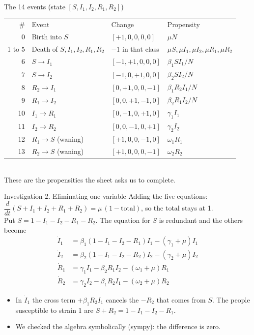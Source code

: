 \begin{frame}{The 14 events (state $[S,I_1,I_2,R_1,R_2]$)}
\small
\renewcommand{\arraystretch}{1.18}
\centering
\begin{tabular}{r l l l}
\rowcolor{aimsred}\color{white}\# & \color{white}Event & \color{white}Change & \color{white}Propensity\\
0 & Birth into $S$ & $[+1,0,0,0,0]$ & $\mu N$\\
\rowcolor{rowpink} 1 to 5 & Death of $S,I_1,I_2,R_1,R_2$ & $-1$ in that class & $\mu S,\mu I_1,\mu I_2,\mu R_1,\mu R_2$\\
6 & $S\to I_1$ & $[-1,+1,0,0,0]$ & $\beta_1SI_1/N$\\
\rowcolor{rowpink} 7 & $S\to I_2$ & $[-1,0,+1,0,0]$ & $\beta_2SI_2/N$\\
8 & $R_2\to I_1$ & $[0,+1,0,0,-1]$ & $\beta_1R_2I_1/N$\\
\rowcolor{rowpink} 9 & $R_1\to I_2$ & $[0,0,+1,-1,0]$ & $\beta_2R_1I_2/N$\\
10 & $I_1\to R_1$ & $[0,-1,0,+1,0]$ & $\gamma_1I_1$\\
\rowcolor{rowpink} 11 & $I_2\to R_2$ & $[0,0,-1,0,+1]$ & $\gamma_2I_2$\\
12 & $R_1\to S$ (waning) & $[+1,0,0,-1,0]$ & $\omega_1R_1$\\
\rowcolor{rowpink} 13 & $R_2\to S$ (waning) & $[+1,0,0,0,-1]$ & $\omega_2R_2$\\
\end{tabular}
\\[0.6em]
{\footnotesize These are the propensities the sheet asks us to complete.}
\end{frame}

\begin{frame}{Investigation 2. Eliminating one variable}
\small
Adding the five equations: $\dfrac{d}{dt}(S+I_1+I_2+R_1+R_2)=\mu\,(1-\text{total})$, so the total stays at 1.\\[0.4em]
Put $S=1-I_1-I_2-R_1-R_2$. The equation for $S$ is redundant and the others become
\[
\begin{aligned}
\dot I_1&=\beta_1(1-I_1-I_2-R_1)I_1-(\gamma_1+\mu)I_1\\
\dot I_2&=\beta_2(1-I_1-I_2-R_2)I_2-(\gamma_2+\mu)I_2\\
\dot R_1&=\gamma_1I_1-\beta_2R_1I_2-(\omega_1+\mu)R_1\\
\dot R_2&=\gamma_2I_2-\beta_1R_2I_1-(\omega_2+\mu)R_2
\end{aligned}
\]
\begin{itemize}\setlength\itemsep{0.3em}
  \item In $\dot I_1$ the cross term $+\beta_1R_2I_1$ cancels the $-R_2$ that comes from $S$. The people susceptible to strain 1 are $S+R_2=1-I_1-I_2-R_1$.
  \item We checked the algebra symbolically (sympy): the difference is zero.
\end{itemize}
\end{frame}

